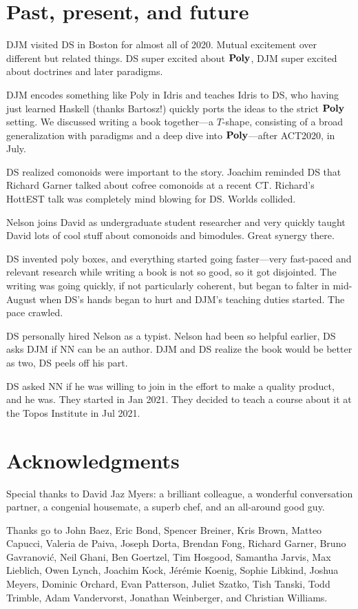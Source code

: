 \documentclass[Book-Poly]{subfiles}
\begin{document}
\section*{Past, present, and future}

DJM visited DS in Boston for almost all of 2020. Mutual excitement over different but related things. DS super excited about $\mathbf{Poly}$, DJM super excited about doctrines and later paradigms.

DJM encodes something like Poly in Idris and teaches Idris to DS, who having just learned Haskell (thanks Bartosz!) quickly ports the ideas to the strict $\mathbf{Poly}$ setting. We discussed writing a book together---a $T$-shape, consisting of a broad generalization with paradigms and a deep dive into $\mathbf{Poly}$---after ACT2020, in July.

DS realized comonoids were important to the story. Joachim reminded DS that Richard Garner talked about cofree comonoids at a recent CT. Richard's HottEST talk was completely mind blowing for DS. Worlds collided.

Nelson joins David as undergraduate student researcher and very quickly taught David lots of cool stuff about comonoids and bimodules. Great synergy there. 

DS invented poly boxes, and everything started going faster---very fast-paced and relevant research while writing a book is not so good, so it got disjointed. The writing was going quickly, if not particularly coherent, but began to falter in mid-August when DS's hands began to hurt and DJM's teaching duties started. The pace crawled. 

DS personally hired Nelson as a typist. Nelson had been so helpful earlier, DS asks DJM if NN can be an author. DJM and DS realize the book would be better as two, DS peels off his part. 

DS asked NN if he was willing to join in the effort to make a quality product, and he was. They started in Jan 2021. They decided to teach a course about it at the Topos Institute in Jul 2021.

\section*{Acknowledgments}

Special thanks to David Jaz Myers: a brilliant colleague, a wonderful conversation partner, a congenial housemate, a superb chef, and an all-around good guy. 

Thanks go to John Baez, Eric Bond, Spencer Breiner, Kris Brown, Matteo Capucci, Valeria de Paiva, Joseph Dorta, Brendan Fong, Richard Garner, Bruno Gavranovi\'c, Neil Ghani, Ben Goertzel, Tim Hosgood, Samantha Jarvis, Max Lieblich, Owen Lynch, Joachim Kock, J\'er\'emie Koenig, Sophie Libkind, Joshua Meyers, Dominic Orchard, Evan Patterson, Juliet Szatko, Tish Tanski, Todd Trimble, Adam Vandervorst, Jonathan Weinberger, and Christian Williams.
\end{document}

